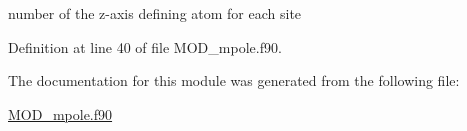 number of the z-\/axis defining atom for each site 



Definition at line 40 of file M\-O\-D\-\_\-mpole.\-f90.



The documentation for this module was generated from the following file\-:\begin{DoxyCompactItemize}
\item 
\hyperlink{MOD__mpole_8f90}{M\-O\-D\-\_\-mpole.\-f90}\end{DoxyCompactItemize}
